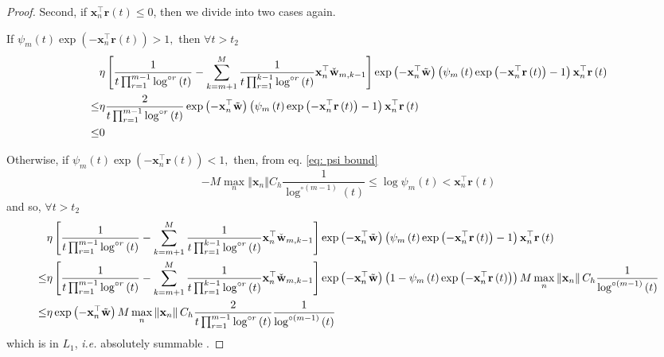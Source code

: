 \documentclass[twoside,11pt,english]{article}
\begin{document}
{\begin{proof}
Second, if $\mathbf{x}_{n}^{\top}\mathbf{r}\left(t\right)\leq0$,
then we divide into two cases again. 

If $\psi_{m}\left(t\right)\exp\left(-\mathbf{x}_{n}^{\top}\mathbf{r}\left(t\right)\right)>1,$
then $\forall t>t_{2}$
\begin{align*}
 & \eta\left[\frac{1}{t\prod_{r=1}^{m-1}\log^{\circ r}\left(t\right)}-\sum_{k=m+1}^{M}\frac{1}{t\prod_{r=1}^{k-1}\log^{\circ r}\left(t\right)}\mathbf{x}_{n}^{\top}\check{\mathbf{w}}_{m,k-1}\right]\exp\left(-\mathbf{x}_{n}^{\top}\tilde{\mathbf{w}}\right)\left(\psi_{m}\left(t\right)\exp\left(-\mathbf{x}_{n}^{\top}\mathbf{r}\left(t\right)\right)-1\right)\mathbf{x}_{n}^{\top}\mathbf{r}\left(t\right)\\
\leq & \eta\frac{2}{t\prod_{r=1}^{m-1}\log^{\circ r}\left(t\right)}\exp\left(-\mathbf{x}_{n}^{\top}\tilde{\mathbf{w}}\right)\left(\psi_{m}\left(t\right)\exp\left(-\mathbf{x}_{n}^{\top}\mathbf{r}\left(t\right)\right)-1\right)\mathbf{x}_{n}^{\top}\mathbf{r}\left(t\right)\\
\leq & 0
\end{align*}

Otherwise, if $\psi_{m}\left(t\right)\exp\left(-\mathbf{x}_{n}^{\top}\mathbf{r}\left(t\right)\right)<1,$
then, from eq. \ref{eq: psi bound} 
\[
-M\max_{n}\left\Vert \mathbf{x}_{n}\right\Vert C_{h}\frac{1}{\log^{\circ\left(m-1\right)}\left(t\right)}\leq\log\psi_{m}\left(t\right)<\mathbf{x}_{n}^{\top}\mathbf{r}\left(t\right)
\]
and so, $\forall t>t_{2}$
\begin{align*}
 & \eta\left[\frac{1}{t\prod_{r=1}^{m-1}\log^{\circ r}\left(t\right)}-\sum_{k=m+1}^{M}\frac{1}{t\prod_{r=1}^{k-1}\log^{\circ r}\left(t\right)}\mathbf{x}_{n}^{\top}\check{\mathbf{w}}_{m,k-1}\right]\exp\left(-\mathbf{x}_{n}^{\top}\tilde{\mathbf{w}}\right)\left(\psi_{m}\left(t\right)\exp\left(-\mathbf{x}_{n}^{\top}\mathbf{r}\left(t\right)\right)-1\right)\mathbf{x}_{n}^{\top}\mathbf{r}\left(t\right)\\
\leq & \eta\left[\frac{1}{t\prod_{r=1}^{m-1}\log^{\circ r}\left(t\right)}-\sum_{k=m+1}^{M}\frac{1}{t\prod_{r=1}^{k-1}\log^{\circ r}\left(t\right)}\mathbf{x}_{n}^{\top}\check{\mathbf{w}}_{m,k-1}\right]\exp\left(-\mathbf{x}_{n}^{\top}\tilde{\mathbf{w}}\right)\left(1-\psi_{m}\left(t\right)\exp\left(-\mathbf{x}_{n}^{\top}\mathbf{r}\left(t\right)\right)\right)M\max_{n}\left\Vert \mathbf{x}_{n}\right\Vert C_{h}\frac{1}{\log^{\circ\left(m-1\right)}\left(t\right)}\\
\leq & \eta\exp\left(-\mathbf{x}_{n}^{\top}\tilde{\mathbf{w}}\right)M\max_{n}\left\Vert \mathbf{x}_{n}\right\Vert C_{h}\frac{2}{t\prod_{r=1}^{m-1}\log^{\circ r}\left(t\right)}\frac{1}{\log^{\circ\left(m-1\right)}\left(t\right)}
\end{align*}
which is in $L_{1}$, \emph{i.e.} absolutely summable .


\end{proof}}
\end{document}
